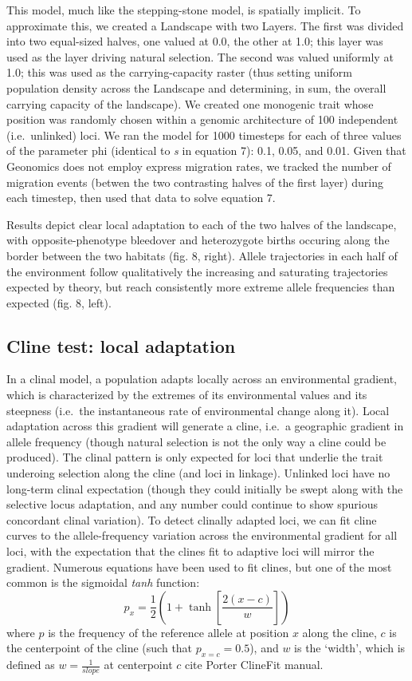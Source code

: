 ﻿\documentclass{article}
\begin{document}
This model, much like the stepping-stone model, is spatially implicit.
To approximate this, we created a Landscape with two Layers.
The first was divided into two equal-sized halves, one valued at 0.0, the other at 1.0;
this layer was used as the layer driving natural selection.
The second was valued uniformly at 1.0; this was used as the carrying-capacity raster
(thus setting uniform population density across the Landscape and determining,
in sum, the overall carrying capacity of the landscape).
We created one monogenic trait whose position was randomly chosen within a 
genomic architecture of 100 independent (i.e.\ unlinked) loci.
We ran the model for 1000 timesteps for each of three values of the parameter phi
(identical to \emph{s} in equation 7): 0.1, 0.05, and 0.01.
Given that Geonomics does not employ express migration rates,
we tracked the number of migration events (betwen the two contrasting halves of the first layer)
during each timestep, then used that data to solve equation 7.

Results depict clear local adaptation to each of the two halves of the landscape,
with opposite-phenotype bleedover and heterozygote births occuring along
the border between the two habitats (fig. 8, right).
Allele trajectories in each half of the environment follow qualitatively 
the increasing and saturating trajectories expected by theory,
but reach consistently more extreme allele frequencies than expected (fig. 8, left).


\subsection{Cline test: local adaptation}
In a clinal model, a population adapts locally across an environmental gradient,
which is characterized by the extremes of its environmental values and its steepness
(i.e.\ the instantaneous rate of environmental change along it).
Local adaptation across this gradient will generate a cline,
i.e.\ a geographic gradient in allele frequency
(though natural selection is not the only way a cline could be produced).
The clinal pattern is only expected for loci that underlie the trait underoing
selection along the cline (and loci in linkage).
Unlinked loci have no long-term clinal expectation
(though they could initially be swept along with the selective locus adaptation,
and any number could continue to show spurious concordant clinal variation).
To detect clinally adapted loci, we can fit cline curves to the allele-frequency
variation across the environmental gradient for all loci,
with the expectation that the clines fit to adaptive loci will mirror the gradient.
Numerous equations have been used to fit clines, but one of the most common
is the sigmoidal \emph{tanh} function:
\begin{equation}
p_{x} = \frac{1}{2}(1 + \tanh[\frac{2(x - c)}{w}])
\end{equation}
where $p$ is the frequency of the reference allele at position $x$ along the cline,
$c$ is the centerpoint of the cline (such that $p_{x=c} = 0.5$), and $w$ is the 
`width', which is defined as $w = \frac{1}{slope}$ at centerpoint
$c$ {\large cite Porter ClineFit manual}.
\end{document}
